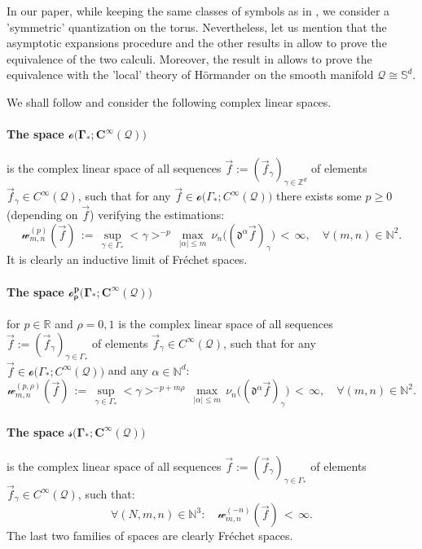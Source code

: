\documentclass[12pt]{article}
\theoremstyle{definition}
\def\R{\mathbb{R}}
\def\Zd{\mathbb{Z}^d}
\def\T{\mathcal{Q}}
\def\dd{\mathfrak{d}}
\def\beq{\begin{equation}}
\def\eeq{\end{equation}}
\def\Sd{\mathbb{S}^d}
\numberwithin{equation}{section}
\begin{document}
In our paper, while keeping the same classes of symbols as in \cite{RT-10,RT-06, McL-91}, we consider a 'symmetric' quantization on the torus. Nevertheless, let us mention that the asymptotic expansions  procedure and the other results in \cite{RT-06} allow to prove the equivalence of the two calculi. Moreover, the result in \cite{McL-91} allows to prove the equivalence with the 'local' theory of H\"{o}rmander on the smooth manifold $\T\cong\Sd$.

We shall follow \cite{RT-06, McL-91} and consider the following complex linear spaces. 

	\paragraph{The space $\mathbf{\mathcal{o}\big(\Gamma_*;C^\infty(\T)\big)}$} is the complex linear space of all sequences $\vec{f}:=(\vec{f}_\gamma)_{\gamma\in\Zd}$ of elements $\vec{f}_\gamma\in C^\infty(\T)$, such that for any $\vec{f}\in\mathcal{o}\big(\Gamma_*;C^\infty(\T)\big)$ there exists some $p\geq0$ (depending on $\vec{f}$) verifying the estimations:
	\beq\label{DF-wp}
	\mathcal{w}^{(p)}_{m,n}(\vec{f})\,:=\,\underset{\gamma\in\Gamma_*}{\sup}<\gamma>^{-p}\,\underset{|\alpha|\leq{m}}{\max}\,\nu_n\big((\dd^\alpha\vec{f})_{\gamma}\big)\,<\,\infty,\quad\forall (m,n)\in\mathbb{N}^2.
	\eeq
It is clearly an inductive limit of Fr\'{e}chet spaces. 

	\paragraph{The space $\boldsymbol{\mathcal{o}^p_\rho\big(\Gamma_*;C^\infty(\T)\big)}$} for $p\in\R$ and $\rho=0,1$ is the complex linear space of all sequences $\vec{f}:=(\vec{f}_\gamma)_{\gamma\in\Gamma_*}$ of elements $\vec{f}_\gamma\in C^\infty(\T)$, such that for any $\vec{f}\in\mathcal{o}\big(\Gamma_*;C^\infty(\T)\big)$ and any $\alpha\in\mathbb{N}^d$:
	\beq\label{DF-wp-rho}
	\mathcal{w}^{(p,\rho)}_{m,n}(\vec{f})\,:=\,\underset{\gamma\in\Gamma_*}{\sup}<\gamma>^{-p+m\rho}\,\underset{|\alpha|\leq{m}}{\max}\,\nu_n\big((\dd^\alpha\vec{f})_{\gamma}\big)\,<\,\infty,\quad\forall (m,n)\in\mathbb{N}^2.
	\eeq
	
	\paragraph{The space $\mathbf{\mathcal{s}\big(\Gamma_*;C^\infty(\T)\big)}$} is the complex linear space of all sequences $\vec{f}:=(\vec{f}_\gamma)_{\gamma\in\Gamma_*}$ of elements $\vec{f}_\gamma\in C^\infty(\T)$, such that:
	\beq\label{DF-s}
	\forall (N,m,n)\in\mathbb{N}^3:\quad\mathcal{w}^{(-n)}_{m,n}(\vec{f})\,<\,\infty.
	\eeq
The last two families of spaces are clearly  Fr\'{e}chet spaces.
\end{document}

